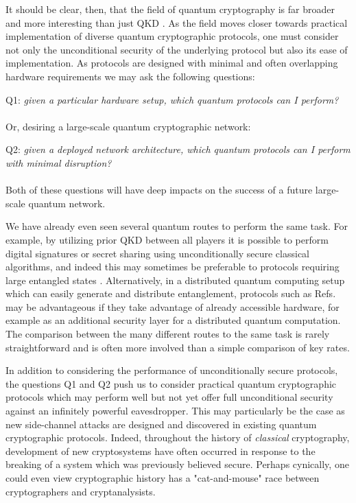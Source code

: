 It should be clear, then, that the field of quantum cryptography is far broader and more interesting than just QKD \cite{Broadbent2015}. As the field moves closer towards practical implementation of diverse quantum cryptographic protocols, one must consider not only the unconditional security of the underlying protocol but also its ease of implementation. As protocols are designed with minimal and often overlapping hardware requirements we may ask the following questions:
\\
\par
Q1:\emph{ given a particular hardware setup, which quantum protocols can I perform?}
\\
\\
\noindent Or, desiring a large-scale quantum cryptographic network:
\\
\par
Q2:\emph{ given a deployed network architecture, which quantum protocols can I perform with minimal disruption?}
\\
\\
\noindent Both of these questions will have deep impacts on the success of a future large-scale quantum network. %

We have already even seen several quantum routes to perform the same task. For example, by utilizing prior QKD between all players it is possible to perform digital signatures \cite{Wallden2015, Amiri2016a} or secret sharing \cite{Shamir1979, Blakley1979, Schneier1996} using unconditionally secure classical algorithms, and indeed this may sometimes be preferable to protocols requiring large entangled states \cite{Gottesman2001, Hillery1999}. Alternatively, in a distributed quantum computing setup which can easily generate and distribute entanglement, protocols such as Refs.~\cite{Bell2014, Kogias2017} may be advantageous if they take advantage of already accessible hardware, for example as an additional security layer for a distributed quantum computation. The comparison between the many different routes to the same task is rarely straightforward and is often more involved than a simple comparison of key rates.

In addition to considering the performance of unconditionally secure protocols, the questions Q1 and Q2 push us to consider practical quantum cryptographic protocols which may perform well but not yet offer full unconditional security against an infinitely powerful eavesdropper. This may particularly be the case as new side-channel attacks are designed and discovered in existing quantum cryptographic protocols. Indeed, throughout the history of \emph{classical} cryptography, development of new cryptosystems have often occurred in response to the breaking of a system which was previously believed secure. Perhaps cynically, one could even view cryptographic history has a "cat-and-mouse" race between cryptographers and cryptanalysists.%

